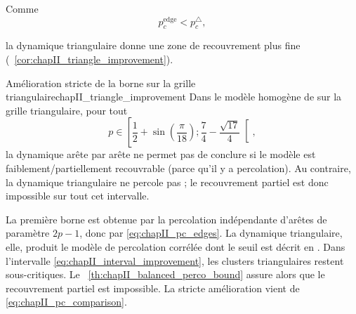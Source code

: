 Comme
\begin{equation}
    p_c^{\mathrm{edge}}<p_c^{\triangle},
    \label{eq:chapII_pc_comparison}
\end{equation}

la dynamique triangulaire donne une zone de recouvrement plus fine (\Cor~\ref{cor:chapII_triangle_improvement}).

\begin{Corollaire}{Amélioration stricte de la borne sur la grille triangulaire}{chapII_triangle_improvement}
Dans le modèle homogène de \SB{} sur la grille triangulaire, pour tout
\begin{equation}
    p\in
    \left[
    \frac12+\sin\left(\frac\pi{18}\right) ;
    \frac74-\frac{\sqrt{17}}4
    \right[,
    \label{eq:chapII_interval_improvement}
\end{equation}
la dynamique \SW{} arête par arête ne permet pas de conclure si le modèle est faiblement/partiellement recouvrable (parce qu'il y a percolation). Au contraire, la dynamique triangulaire ne percole pas ; le recouvrement partiel est donc impossible sur tout cet intervalle.
\end{Corollaire}

\begin{Preuve}
La première borne est obtenue par la percolation indépendante d'arêtes de paramètre $2p-1$, donc par \eqref{eq:chapII_pc_edges}. La dynamique triangulaire, elle, produit le modèle de percolation corrélée dont le seuil est décrit en . Dans l'intervalle \eqref{eq:chapII_interval_improvement}, les clusters triangulaires restent sous-critiques. Le \Th~\ref{th:chapII_balanced_perco_bound} assure alors que le recouvrement partiel est impossible. La stricte amélioration vient de \eqref{eq:chapII_pc_comparison}.
\end{Preuve}


